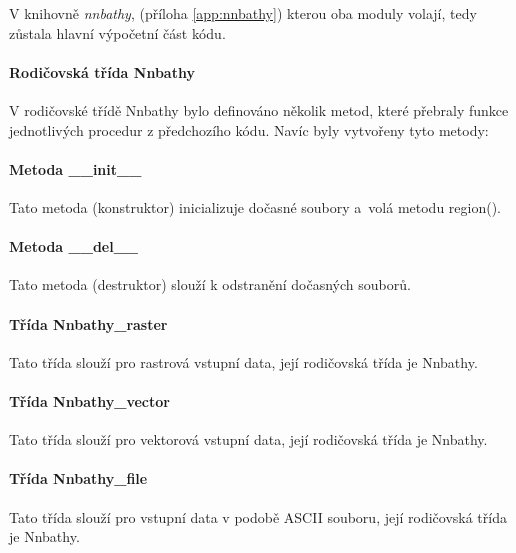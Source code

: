 \documentclass[12pt,a4paper]{article}
\begin{document}
V knihovně {\em nnbathy}, (příloha \ref{app:nnbathy}) kterou oba moduly volají, tedy zůstala hlavní
výpočetní část kódu.

\paragraph{Rodičovská třída Nnbathy} V rodičovské třídě Nnbathy bylo
definováno několik metod, které přebraly funkce jednotlivých procedur
z předchozího kódu. Navíc byly vytvořeny tyto metody:

\paragraph{Metoda \_\_init\_\_}
Tato metoda (konstruktor) inicializuje dočasné soubory a~volá metodu region().

\paragraph{Metoda \_\_del\_\_}
Tato metoda (destruktor) slouží k odstranění dočasných souborů.

\paragraph{Třída Nnbathy\_raster}
Tato třída slouží pro rastrová vstupní data, její rodičovská třída je Nnbathy.

\paragraph{Třída Nnbathy\_vector}
Tato třída slouží pro vektorová vstupní data, její rodičovská třída je Nnbathy.

\paragraph{Třída Nnbathy\_file}
Tato třída slouží pro vstupní data v podobě ASCII souboru, její rodičovská třída je Nnbathy.

\end{document}
